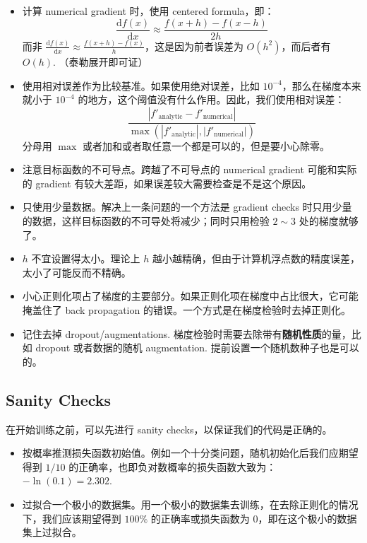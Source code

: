 \begin{itemize}
    \item 计算 numerical gradient 时，使用 centered formula，即：
    \[
    \frac{\mathrm df(x)}{\mathrm dx}\approx\frac{f(x+h)-f(x-h)}{2h}
    \]
    而非 $\frac{\mathrm df(x)}{\mathrm dx}\approx\frac{f(x+h)-f(x)}{h}$，这是因为前者误差为 $O(h^2)$，而后者有 $O(h)$. （泰勒展开即可证）

    \item 使用相对误差作为比较基准。如果使用绝对误差，比如 $10^{-4}$，那么在梯度本来就小于 $10^{-4}$ 的地方，这个阈值没有什么作用。因此，我们使用相对误差：
    \[
    \frac{|f'_{\text{analytic}}-f'_\text{numerical}|}{\max\left(|f'_\text{analytic}|,|f'_\text{numerical}|\right)}
    \]
    分母用 $\max$ 或者加和或者取任意一个都是可以的，但是要小心除零。

    \item 注意目标函数的不可导点。跨越了不可导点的 numerical gradient 可能和实际的 gradient 有较大差距，如果误差较大需要检查是不是这个原因。

    \item 只使用少量数据。解决上一条问题的一个方法是 gradient checks 时只用少量的数据，这样目标函数的不可导处将减少；同时只用检验 $2\sim3$ 处的梯度就够了。

    \item $h$ 不宜设置得太小。理论上 $h$ 越小越精确，但由于计算机浮点数的精度误差，太小了可能反而不精确。

    \item 小心正则化项占了梯度的主要部分。如果正则化项在梯度中占比很大，它可能掩盖住了 back propagation 的错误。一个方式是在梯度检验时去掉正则化。

    \item 记住去掉 dropout/augmentations. 梯度检验时需要去除带有\textbf{随机性质}的量，比如 dropout 或者数据的随机 augmentation. 提前设置一个随机数种子也是可以的。

\end{itemize}

\subsection{Sanity Checks}

在开始训练之前，可以先进行 sanity checks，以保证我们的代码是正确的。

\begin{itemize}
    \item 按概率推测损失函数初始值。例如一个十分类问题，随机初始化后我们应期望得到 $1/10$ 的正确率，也即负对数概率的损失函数大致为：$-\ln(0.1)=2.302$.
    \item 过拟合一个极小的数据集。用一个极小的数据集去训练，在去除正则化的情况下，我们应该期望得到 $100\%$ 的正确率或损失函数为 $0$，即在这个极小的数据集上过拟合。

\end{itemize}

